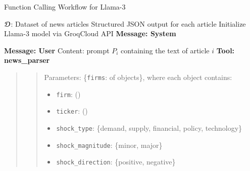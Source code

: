 
\begin{algorithm}[H]
\caption{Function Calling Workflow for Llama-3}
\label{alg:function_calling}
\begin{algorithmic}[1]
\Require $\mathcal{D}$: Dataset of news articles
\Ensure Structured JSON output for each article
\State Initialize Llama-3 model via GroqCloud API
 \Comment{\scalebox{0.9}{\textcolor{lightgray}{Iterate over each article in the dataset}}}
    \State \textbf{Message: System} \Comment{\scalebox{0.9}{\textcolor{lightgray}{Define the role and task for the LLM}}}

		\begin{quote}
		\end{quote}


    \State \textbf{Message: User} \Comment{\scalebox{0.9}{\textcolor{lightgray}{User provides the article text as input}}}
    \Statex \hspace{1cm} Content: prompt $P_i$ containing the text of article $i$
    \State \textbf{Tool: news\_parser} 
%    
\begin{quote}
\begin{quote}
Parameters: \{\texttt{firms}:  of objects\}, where each object contains:
            \begin{itemize}
                \item \texttt{firm}: \hspace{2.1cm}  ()
                \item \texttt{ticker}: \hspace{1.7cm}  ()
                \item \texttt{shock\_type}: \hspace{0.9cm}  \{demand, supply, financial, policy, technology\}
                \item \texttt{shock\_magnitude}:  \hspace{0cm} \{minor, major\}
                \item \texttt{shock\_direction}: \hspace{0cm} \{positive, negative\}
            \end{itemize} 
\end{quote} 
\end{quote} 
 

\end{algorithmic}
\end{algorithm}
